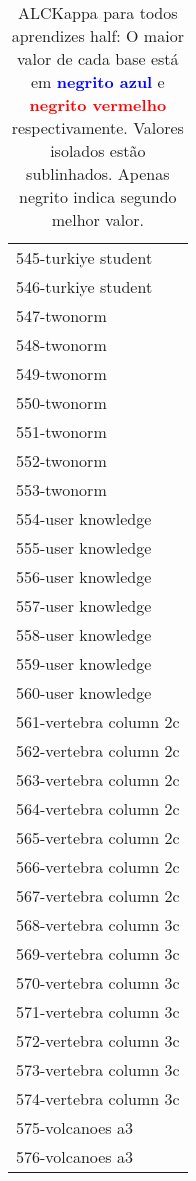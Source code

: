 \begin{table}[h]
\caption{ALCKappa para todos aprendizes half: O maior valor de cada base está em \textcolor{blue}{\textbf{negrito azul}} e \textcolor{red}{\textbf{negrito vermelho}} respectivamente. Valores isolados estão sublinhados. Apenas negrito indica segundo melhor valor.}
\begin{center}\begin{tabular}{l}
 & \\ \hline 545-turkiye student &  \\
546-turkiye student &  \\
547-twonorm &  \\
548-twonorm &  \\
549-twonorm &  \\
550-twonorm &  \\
551-twonorm &  \\ \hline
552-twonorm &  \\
553-twonorm &  \\
554-user knowledge &  \\
555-user knowledge &  \\
556-user knowledge &  \\
557-user knowledge &  \\
558-user knowledge &  \\ \hline
559-user knowledge &  \\
560-user knowledge &  \\
561-vertebra column 2c &  \\
562-vertebra column 2c &  \\
563-vertebra column 2c &  \\
564-vertebra column 2c &  \\
565-vertebra column 2c &  \\ \hline
566-vertebra column 2c &  \\
567-vertebra column 2c &  \\
568-vertebra column 3c &  \\
569-vertebra column 3c &  \\
570-vertebra column 3c &  \\
571-vertebra column 3c &  \\
572-vertebra column 3c &  \\ \hline
573-vertebra column 3c &  \\
574-vertebra column 3c &  \\
575-volcanoes a3 &  \\
576-volcanoes a3 &  \\\end{tabular}\label{stratsALCKappa17AllReduxHalfb}
\end{center}
\end{table}
